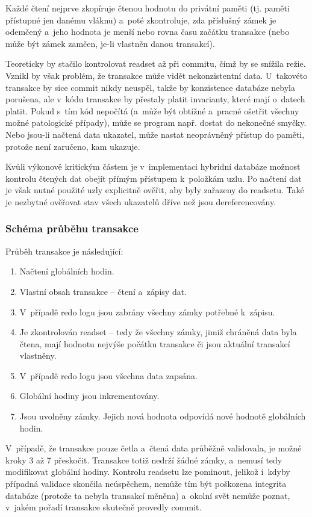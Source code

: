 Každé čtení nejprve
zkopíruje čtenou hodnotu do privátní paměti (tj. paměti přístupné jen danému vláknu)
a~poté zkontroluje, zda příslušný
zámek je odemčený a~jeho hodnota je menší nebo rovna času začátku transakce (nebo může
být zámek zamčen, je-li vlastněn danou transakcí).

 Teoreticky by stačilo kontrolovat
readset až při commitu, čímž by se snížila režie. Vznikl by však problém,
že transakce může vidět nekonzistentní data.
U~takovéto transakce by sice commit
nikdy neuspěl, takže by konzistence databáze nebyla porušena, ale v~kódu transakce
by přestaly platit invarianty, které mají o~datech platit. Pokud s~tím kód nepočítá
(a~může být obtížné a~pracné ošetřit všechny možné patologické případy),
může se program např. dostat do nekonečné smyčky. Nebo jsou-li načtená data ukazatel,
může nastat neoprávněný přístup do paměti, protože není zaručeno, kam ukazuje.

Kvůli výkonově kritickým částem je v~implementaci hybridní databáze možnost
kontrolu čtených dat obejít přímým přístupem k~položkám uzlu. Po načtení dat
je však nutné použité uzly explicitně ověřit, aby byly zařazeny do readsetu. Také
je nezbytné ověřovat stav všech ukazatelů dříve než jsou dereferencovány.


\subsubsection*{Schéma průběhu transakce}

Průběh transakce je následující:
\begin{enumerate}
  \item Načtení globálních hodin.
  \item Vlastní obsah transakce -- čtení a~zápisy dat.
  \item V~případě redo logu jsou zabrány všechny zámky potřebné k~zápisu.
  \item Je zkontrolován readset -- tedy že všechny zámky, jimiž chráněná data byla
        čtena, mají hodnotu nejvýše počátku transakce či jsou aktuální transakcí
        vlastněny.
  \item V~případě redo logu jsou všechna data zapsána.
  \item Globální hodiny jsou inkrementovány.
  \item Jsou uvolněny zámky. Jejich nová hodnota odpovídá nové hodnotě globálních
        hodin.
\end{enumerate}

V~případě, že transakce pouze četla a~čtená data průběžně validovala,
je možné kroky 3 až 7 přeskočit. Transakce
totiž nedrží žádné zámky, a~nemusí tedy modifikovat globální hodiny. Kontrolu
readsetu lze pominout, jelikož i~kdyby případná validace skončila neúspěchem,
nemůže tím být poškozena integrita databáze (protože ta nebyla transakcí měněna)
a~okolní svět nemůže poznat, v~jakém pořadí transakce skutečně provedly commit.

